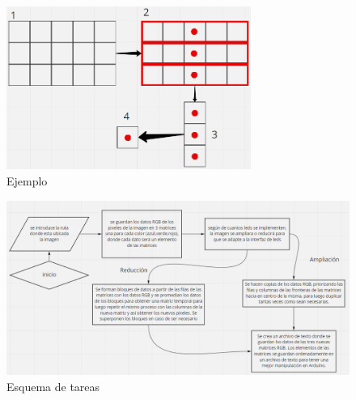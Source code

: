\documentclass{article}
\begin{document}
	\begin{figure}[h]
		\includegraphics[width=8cm]{ejemplo.png}
		\centering
		\caption{Ejemplo}
		\label{fig:figura 1}
	\end{figure}
	
	\begin{figure}[h]
		\includegraphics[width=12cm]{algoritmo.png}
		\centering
		\caption{Esquema de tareas}
		\label{fig:figura 2}
	\end{figure}
	
\end{document}
